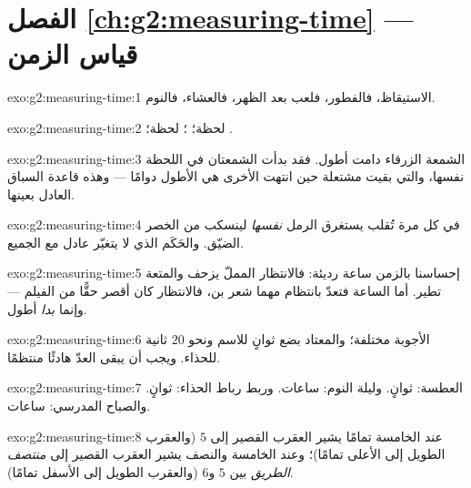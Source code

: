 \section*{الفصل \ref{ch:g2:measuring-time} --- قياس الزمن}

\begin{solution}{exo:g2:measuring-time:1}
الاستيقاظ، فالفطور، فلعب بعد الظهر، فالعشاء، فالنوم.
\end{solution}

\begin{solution}{exo:g2:measuring-time:2}
لحظة؛ ؛ لحظة؛ .
\end{solution}

\begin{solution}{exo:g2:measuring-time:3}
الشمعة الزرقاء دامت أطول. فقد بدأت الشمعتان في اللحظة نفسها،
والتي بقيت مشتعلة حين انتهت الأخرى هي الأطول دوامًا --- وهذه
قاعدة السباق العادل بعينها.
\end{solution}

\begin{solution}{exo:g2:measuring-time:4}
في كل مرة تُقلب يستغرق الرمل \emph{ نفسها} لينسكب من الخصر
الضيّق. والحَكَم الذي لا يتغيّر عادل مع الجميع.
\end{solution}

\begin{solution}{exo:g2:measuring-time:5}
إحساسنا بالزمن ساعة رديئة: فالانتظار المملّ يزحف والمتعة تطير.
أما الساعة فتعدّ بانتظام مهما شعر بن، فالانتظار كان أقصر حقًّا
من الفيلم --- وإنما \emph{بدا} أطول.
\end{solution}

\begin{solution}{exo:g2:measuring-time:6}
الأجوبة مختلفة؛ والمعتاد بضع ثوانٍ للاسم ونحو $20$ ثانية
للحذاء. ويجب أن يبقى العدّ هادئًا منتظمًا.
\end{solution}

\begin{solution}{exo:g2:measuring-time:7}
العطسة: ثوانٍ. وليلة النوم: ساعات. وربط رباط الحذاء: ثوانٍ.
والصباح المدرسي: ساعات.
\end{solution}

\begin{solution}{exo:g2:measuring-time:8}
عند الخامسة تمامًا يشير العقرب القصير إلى $5$ (والعقرب الطويل
إلى الأعلى تمامًا)؛ وعند الخامسة والنصف يشير العقرب القصير إلى
\emph{منتصف الطريق} بين $5$ و$6$ (والعقرب الطويل إلى الأسفل
تمامًا).
\end{solution}

